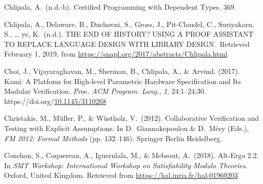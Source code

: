 \documentclass[12pt,twoside]{article}
\begin{document}
{\begin{thebibliography}{222}
\mdbibitemlabel{}Chlipala, A.~(n.d.-b). Certiﬁed Programming with Dependent Types, 369.\label{chlipala_certied_nodate}%

\mdbibitemlabel{}Chlipala, A., Delaware, B., Duchovni, S., Gross, J., Pit-Claudel, C., Suriyakarn, S., … ye, K.~(n.d.). THE END OF HISTORY? USING A PROOF ASSISTANT TO REPLACE LANGUAGE DESIGN WITH LIBRARY DESIGN.~Retrieved February 1, 2019, from \href{https://snapl.org/2017/abstracts/Chlipala.html}{{\ttfamily https://\hspace{0pt}snapl.\hspace{0pt}org/\hspace{0pt}2017/\hspace{0pt}abstracts/\hspace{0pt}Chlipala.\hspace{0pt}html}}\label{chlipala_end_nodate}%

\mdbibitemlabel{}Choi, J., Vijayaraghavan, M., Sherman, B., Chlipala, A., \& Arvind. (2017). Kami: A Platform for High-level Parametric Hardware Specification and Its Modular Verification. \emph{Proc. ACM Program. Lang.}, \emph{1}, 24:1–24:30. https://doi.org/\href{https://dx.doi.org/10.1145/3110268}{10.1145/3110268}\label{choi_kami:_2017}%

\mdbibitemlabel{}Christakis, M., Müller, P., \& Wüstholz, V.~(2012). Collaborative Verification and Testing with Explicit Assumptions. In D.~Giannakopoulou \& D.~Méry (Eds.), \emph{FM 2012: Formal Methods} (pp. 132–146). Springer Berlin Heidelberg.\label{christakis_collaborative_2012}%

\mdbibitemlabel{}Conchon, S., Coquereau, A., Iguernlala, M., \& Mebsout, A.~(2018). Alt-Ergo 2.2. In \emph{SMT Workshop: International Workshop on Satisfiability Modulo Theories}. Oxford, United Kingdom. Retrieved from \href{https://hal.inria.fr/hal-01960203}{{\ttfamily https://\hspace{0pt}hal.\hspace{0pt}inria.\hspace{0pt}fr/\hspace{0pt}hal-\hspace{0pt}01960203}}\label{conchon_alt-ergo_2018}%


\end{thebibliography}}
\end{document}
